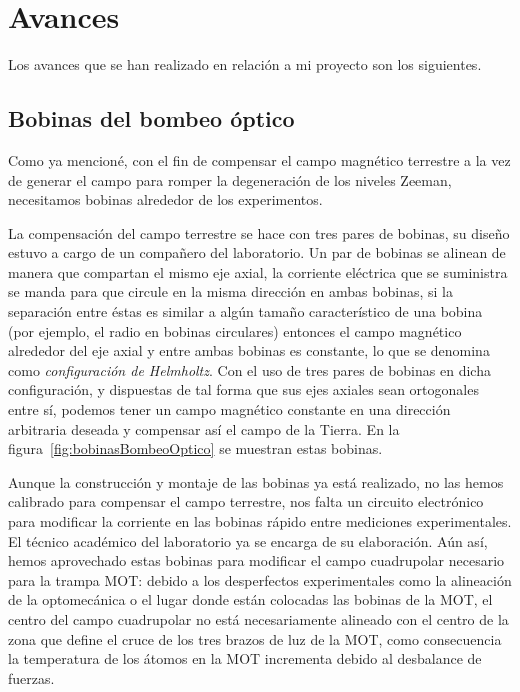 \chapter{\label{cap:avances}Avances}

Los avances que se han realizado en relación a mi proyecto son los siguientes.

\section{\label{sec:bobinasBombeoOptico}Bobinas del bombeo óptico}

Como ya mencioné, con el fin de compensar el campo magnético terrestre a la vez de generar el campo para romper la degeneración de los niveles Zeeman, necesitamos bobinas alrededor de los experimentos.

La compensación del campo terrestre se hace con tres pares de bobinas, su diseño estuvo a cargo de un compañero del laboratorio. Un par de bobinas se alinean de manera que compartan el mismo eje axial, la corriente eléctrica que se suministra se manda para que circule en la misma dirección en ambas bobinas, si la separación entre éstas es similar a algún tamaño característico de una bobina (por ejemplo, el radio en bobinas circulares) entonces el campo magnético alrededor del eje axial y entre ambas bobinas es constante, lo que se denomina como \emph{configuración de Helmholtz}. Con el uso de tres pares de bobinas en dicha configuración, y dispuestas de tal forma que sus ejes axiales sean ortogonales entre sí, podemos tener un campo magnético constante en una dirección arbitraria deseada y compensar así el campo de la Tierra. En la figura~\ref{fig:bobinasBombeoOptico} se muestran estas bobinas.

\p Aunque la construcción y montaje de las bobinas ya está realizado, no las hemos calibrado para compensar el campo terrestre, nos falta un circuito electrónico para modificar la corriente en las bobinas rápido entre mediciones experimentales. El técnico académico del laboratorio ya se encarga de su elaboración. Aún así, hemos aprovechado estas bobinas para modificar el campo cuadrupolar necesario para la trampa MOT: debido a los desperfectos experimentales como la alineación de la optomecánica o el lugar donde están colocadas las bobinas de la MOT, el centro del campo cuadrupolar no está necesariamente alineado con el centro de la zona que define el cruce de los tres brazos de luz de la MOT, como consecuencia la temperatura de los átomos en la MOT incrementa debido al desbalance de fuerzas.

